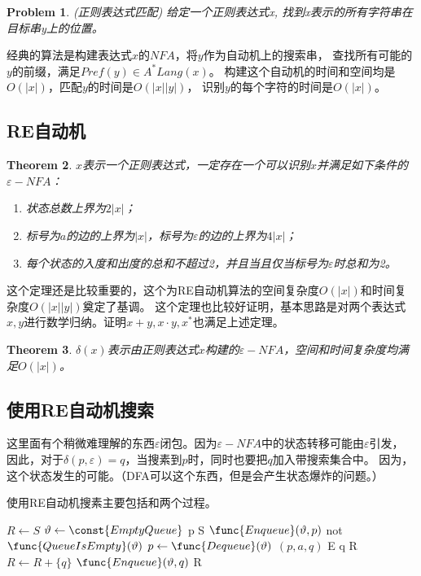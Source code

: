 \documentclass[UTF8]{ctexart}
\newtheorem{thm}{Theorem}[subsection]
\newtheorem{prob}[thm]{Problem}
\theoremstyle{definition}
\theoremstyle{remark}
\numberwithin{equation}{subsection}
\begin{document}
    \begin{prob}
        (正则表达式匹配) 给定一个正则表达式x, 找到x表示的所有字符串在目标串y上的位置。
    \end{prob}
	经典的算法是构建表达式$x$的$NFA$，将$y$作为自动机上的搜索串，
	查找所有可能的$y$的前缀，满足$Pref(y) \in A^*Lang(x)$。
	构建这个自动机的时间和空间均是$O(|x|)$，匹配$y$的时间是$O(|x||y|)$，
	识别$y$的每个字符的时间是$O(|x|)$。
	
\subsection{RE自动机}

	\begin{thm} $x$表示一个正则表达式，一定存在一个可以识别$x$并满足如下条件的$\varepsilon-NFA$：
		\begin{enumerate}[(1)]
		
			\item 状态总数上界为$2|x|$；
			
			\item 标号为$a$的边的上界为$|x|$，标号为$\varepsilon$的边的上界为$4|x|$；
			
			\item 每个状态的入度和出度的总和不超过2，并且当且仅当标号为$\varepsilon$时总和为2。
			
		\end{enumerate}
	\end{thm}
	
	这个定理还是比较重要的，这个为RE自动机算法的空间复杂度$O(|x|)$和时间复杂度$O(|x||y|)$奠定了基调。
	这个定理也比较好证明，基本思路是对两个表达式$x,y$进行数学归纳。证明$x+y, x \cdot y, x^*$也满足上述定理。
	
	\begin{thm}
		$\delta(x)$表示由正则表达式$x$构建的$\varepsilon-NFA$，空间和时间复杂度均满足$O(|x|)$。
	\end{thm}
	
\subsection{使用RE自动机搜索}

	这里面有个稍微难理解的东西$\varepsilon 闭包$。因为$\varepsilon-NFA$中的状态转移可能由$\varepsilon$引发，
	因此，对于$\delta(p,\varepsilon) = q$，当搜素到$p$时，同时也要把$q$加入带搜索集合中。
	因为，这个状态发生的可能。（DFA可以这个东西，但是会产生状态爆炸的问题。）
	
	使用RE自动机搜素主要包括和两个过程。
	\begin{codebox}
		\li $R \gets S$
		\li	$\vartheta \gets \const{EmptyQueue}$
		\li	\For p  S
		\li		\Do $\func{Enqueue}(\vartheta, p)$
				\End
		\li \While not $\func{QueueIsEmpty}(\vartheta)$
		\li		\Do
					$p \gets \func{Dequeue}(\vartheta)$
		\li			\For $(p,a,q)$  E
		\li				\Do
							\If q  R
		\li						\Then $R \gets R + \{q\}$
		\li							  $\func{Enqueue}(\vartheta, q)$
								\End
						\End
				\End
		\li \Return R
	\end{codebox}
	
\end{document}
